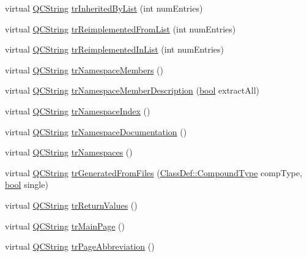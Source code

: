 \begin{DoxyCompactItemize}
virtual \hyperlink{class_q_c_string}{Q\+C\+String} \hyperlink{class_translator_danish_a127a260b250547992284bd0590c6188b}{tr\+Inherited\+By\+List} (int num\+Entries)
\item 
virtual \hyperlink{class_q_c_string}{Q\+C\+String} \hyperlink{class_translator_danish_a91a3f0362c99e788b5ddea3fbecdcab1}{tr\+Reimplemented\+From\+List} (int num\+Entries)
\item 
virtual \hyperlink{class_q_c_string}{Q\+C\+String} \hyperlink{class_translator_danish_a25fc08a37c87825457da45c9b381f24a}{tr\+Reimplemented\+In\+List} (int num\+Entries)
\item 
virtual \hyperlink{class_q_c_string}{Q\+C\+String} \hyperlink{class_translator_danish_a0db0ddb3dc7bc807afec5d0000fc6d09}{tr\+Namespace\+Members} ()
\item 
virtual \hyperlink{class_q_c_string}{Q\+C\+String} \hyperlink{class_translator_danish_a36db40efda78a5865fcee126d42d7f63}{tr\+Namespace\+Member\+Description} (\hyperlink{qglobal_8h_a1062901a7428fdd9c7f180f5e01ea056}{bool} extract\+All)
\item 
virtual \hyperlink{class_q_c_string}{Q\+C\+String} \hyperlink{class_translator_danish_a3a5f9da039040cc83959b262257d16c5}{tr\+Namespace\+Index} ()
\item 
virtual \hyperlink{class_q_c_string}{Q\+C\+String} \hyperlink{class_translator_danish_aff67bbe4ab5cf1a80b4adff71845005a}{tr\+Namespace\+Documentation} ()
\item 
virtual \hyperlink{class_q_c_string}{Q\+C\+String} \hyperlink{class_translator_danish_a3a6815f8ce55647c7dc89e09aca72175}{tr\+Namespaces} ()
\item 
virtual \hyperlink{class_q_c_string}{Q\+C\+String} \hyperlink{class_translator_danish_a36ecff3054f04a48bd925a5504268595}{tr\+Generated\+From\+Files} (\hyperlink{class_class_def_ae70cf86d35fe954a94c566fbcfc87939}{Class\+Def\+::\+Compound\+Type} comp\+Type, \hyperlink{qglobal_8h_a1062901a7428fdd9c7f180f5e01ea056}{bool} single)
\item 
virtual \hyperlink{class_q_c_string}{Q\+C\+String} \hyperlink{class_translator_danish_a61066d9146eebf28cc0e9a3cdd3e63fe}{tr\+Return\+Values} ()
\item 
virtual \hyperlink{class_q_c_string}{Q\+C\+String} \hyperlink{class_translator_danish_ad7767cd4646f24f42f1239d0fcebc633}{tr\+Main\+Page} ()
\item 
virtual \hyperlink{class_q_c_string}{Q\+C\+String} \hyperlink{class_translator_danish_aa17e2218848b1810def3b63ea85c5ae7}{tr\+Page\+Abbreviation} ()

\end{DoxyCompactItemize}
